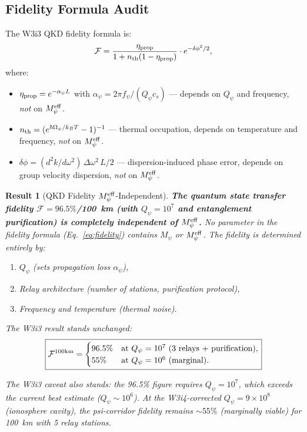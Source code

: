 \documentclass[aps,prd,twocolumn,superscriptaddress,nofootinbib]{revtex4-2}
\newcommand{\Qpsi}{Q_\psi}
\newcommand{\Mpsi}{M_\psi}
\newcommand{\Meff}{M_\psi^{\rm eff}}
\newcommand{\ee}[1]{\times 10^{#1}}
\newtheorem{result}{Result}
\begin{document}
\subsection{Fidelity Formula Audit}

The W3i3 QKD fidelity formula is:
\begin{equation}
\mathcal{F} = \frac{\eta_{\rm prop}}{1 + n_{\rm th}(1-\eta_{\rm prop})}
\cdot e^{-\delta\phi^2/2},
\label{eq:fidelity}
\end{equation}
where:
\begin{itemize}
\item $\eta_{\rm prop} = e^{-\alpha_\psi L}$ with
  $\alpha_\psi = 2\pi f_\psi/(\Qpsi c_s)$ --- depends on $\Qpsi$
  and frequency, \emph{not} on $\Meff$.
\item $n_{\rm th} = (e^{\hbar\Omega_\psi/k_B T} - 1)^{-1}$ --- thermal
  occupation, depends on temperature and frequency, \emph{not} on $\Meff$.
\item $\delta\phi = (d^2k/d\omega^2)\,\Delta\omega^2\,L/2$ ---
  dispersion-induced phase error, depends on group velocity dispersion,
  \emph{not} on $\Meff$.
\end{itemize}

\begin{result}[QKD Fidelity $\Meff$-Independent]
\label{res:fidelity}
\textbf{The quantum state transfer fidelity $\mathcal{F} = 96.5\%$/100~km
(with $\Qpsi = 10^7$ and entanglement purification) is completely
independent of $\Meff$.} No parameter in the fidelity formula
(Eq.~\ref{eq:fidelity}) contains $\Mpsi$ or $\Meff$. The fidelity
is determined entirely by:
\begin{enumerate}
\item $\Qpsi$ (sets propagation loss $\alpha_\psi$),
\item Relay architecture (number of stations, purification protocol),
\item Frequency and temperature (thermal noise).
\end{enumerate}

The W3i3 result stands unchanged:
\begin{equation}
\boxed{\mathcal{F}^{\rm 100km} = \begin{cases}
96.5\% & \text{at }\Qpsi = 10^7\text{ (3 relays + purification)},\\
55\% & \text{at }\Qpsi = 10^6\text{ (marginal)}.
\end{cases}}
\end{equation}

The W3i3 caveat also stands: the 96.5\% figure requires $\Qpsi = 10^7$,
which exceeds the current best estimate ($\Qpsi \sim 10^6$). At the
W3i4-corrected $\Qpsi = 9\ee{8}$ (ionosphere cavity), the psi-corridor
fidelity remains $\sim 55\%$ (marginally viable) for 100~km with
5 relay stations.
\end{result}
\end{document}
